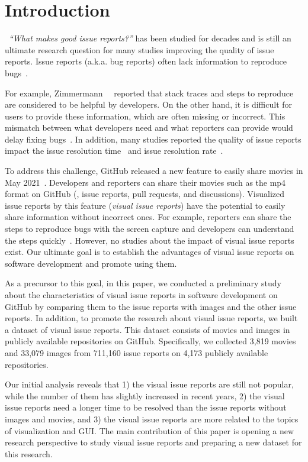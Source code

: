 \section{Introduction}
\label{sec:intro}
~{\it ``What makes good issue reports?''} has been studied for decades and is still an ultimate research question for many studies improving the quality of issue reports\citep{TODO}. Issue reports (a.k.a. bug reports) often lack information to reproduce bugs~\citep{DBLP:conf/msr/JoorabchiMM14}\citep{DearGitHub}. 

For example, Zimmermann~\et~\citep{zimmermann2010TSE} reported  that  stack traces and steps to reproduce are considered to be helpful by developers. On the other hand, it is difficult for users to provide these information, which are often missing or incorrect. 
This mismatch between what developers need and what reporters can provide would delay fixing bugs~\citep{DBLP:conf/msr/JoorabchiMM14}. In addition, many studies reported the quality of issue reports impact the issue resolution time~\citep{DBLP:conf/cscw/BreuPSZ10}\citep{DBLP:conf/icse/GuoZNM10} and issue resolution rate~\citep{DBLP:conf/compsac/ZouXZCL15}\citep{DBLP:conf/icse/ZimmermannNGM12}. 

To address this challenge, GitHub released a new feature to easily share movies in May 2021~\citep{github-video-blog}. Developers and reporters can share their movies such as the mp4 format on GitHub (\eg,  issue reports, pull requests, and discussions). 
Visualized issue reports by this feature (\textit{visual issue reports}) have the potential to easily share information without incorrect ones.  
For example, reporters can share the steps to reproduce bugs with the screen capture and developers can understand the steps quickly~\citep{github-video-blog}. 
However, no studies about the impact of visual issue reports exist. Our ultimate goal is to establish the advantages of visual issue reports on software development and promote using them.


As a precursor to this goal, in this paper, 
we conducted a preliminary study about the characteristics of 
visual issue reports in software development on GitHub
by comparing them to the issue reports with images and 
the other issue reports. 
In addition, to promote the research about visual issue reports, 
we built a dataset of visual issue reports. 
This dataset consists of movies and images 
in publicly available repositories on GitHub. 
Specifically, we collected 
3,819 movies and 
33,079 images from 
711,160 issue reports on
4,173 publicly available repositories.

Our initial analysis reveals that 
1) the visual issue reports are still not popular,
while the number of them has slightly increased in recent years, 
2) the visual issue reports need 
a longer time to be resolved than the issue reports without images and movies, and 
3) the visual issue reports are more related to 
the topics of visualization and GUI. 
The main contribution of this paper is 
opening a new research perspective to study visual issue reports
and preparing a new dataset for this research. 